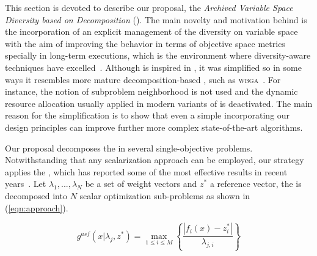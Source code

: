 
This section is devoted to describe our proposal, the \textit{Archived Variable Space Diversity \MOEA{} based on Decomposition} (\AVSDMOEAD{}).
%
The main novelty and motivation behind \AVSDMOEAD{} is the incorporation of an explicit management of the diversity on variable space
with the aim of improving the behavior in terms of objective space metrics specially in long-term executions, which is the
environment where diversity-aware techniques have excelled~\cite{segura2015novel}.
%
Although \AVSDMOEAD{} is inspired in \MOEAD{}, it was simplified so in some ways it resembles more mature
decomposition-based \MOEAS{}, such as \textsc{wbga}~\cite{Hajela:93}.
%
For instance, the notion of subproblem neighborhood is not used and the dynamic resource allocation usually applied in modern variants
of \MOEAD{} is deactivated.
%
The main reason for the simplification is to show that even a simple \MOEA{} incorporating our design principles can
improve further more complex state-of-the-art algorithms.
%

Our proposal decomposes the \MOP{} in several single-objective problems.
%
Notwithstanding that any scalarization approach can be employed, our strategy applies the \ASF{}, 
which has reported some of the most effective results in recent years~\cite{hernandez2015improved}.
%
Let $\lambda_1, ..., \lambda_N$ be a set of weight vectors and $z^*$ a reference vector,
the \MOP{} is decomposed into $N$ scalar optimization sub-problems as shown in (\ref{eqn:approach}).
%

\begin{equation}\label{eqn:approach}
\displaystyle{
 g^{asf}(x| \lambda_j, z^*) = \max_{ 1 \leq i \leq M} \left \{ \frac{ | f_i(x) - z_i^*|}{\lambda_{j,i}} \right \} 
}
\end{equation}

